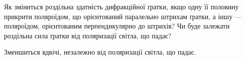 \begin{problem}%
    Як зміниться роздільна здатність дифракційної ґратки, якщо одну її
    половину прикрити поляроїдом, що орієнтований паралельно штрихам
    ґратки, а іншу --- поляроїдом, орієнтованим перпендикулярно до
    штрихів? Чи буде залежати роздільна сила ґратки від поляризації світла,
    що падає?
    \begin{solution}
        Зменшиться вдвічі, незалежно від поляризації світла, що падає.
    \end{solution}
\end{problem}


